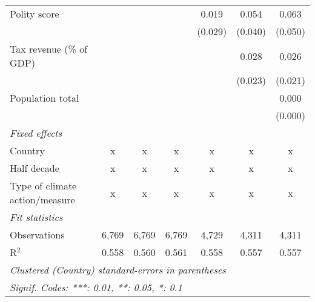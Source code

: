 \begin{tabular}{lcccccc}
   Polity score                                         &               &                &                & 0.019          & 0.054          & 0.063\\   
                                                        &               &                &                & (0.029)        & (0.040)        & (0.050)\\   
   Tax revenue (\% of GDP)                              &               &                &                &                & 0.028          & 0.026\\   
                                                        &               &                &                &                & (0.023)        & (0.021)\\   
   Population total                                     &               &                &                &                &                & 0.000\\   
                                                        &               &                &                &                &                & (0.000)\\   
   \emph{Fixed effects}\\
   Country                                              & x             & x              & x              & x              & x              & x\\  
   Half decade                                          & x             & x              & x              & x              & x              & x\\  
   Type of climate action/measure                       & x             & x              & x              & x              & x              & x\\  
   \midrule \emph{Fit statistics}\\
   Observations                                         & 6,769         & 6,769          & 6,769          & 4,729          & 4,311          & 4,311\\  
   R$^2$                                                & 0.558         & 0.560          & 0.561          & 0.558          & 0.557          & 0.557\\  
   \midrule
   \multicolumn{7}{l}{\emph{Clustered (Country) standard-errors in parentheses}}\\
   \multicolumn{7}{l}{\emph{Signif. Codes: ***: 0.01, **: 0.05, *: 0.1}}\\
\end{tabular}
\par\endgroup


